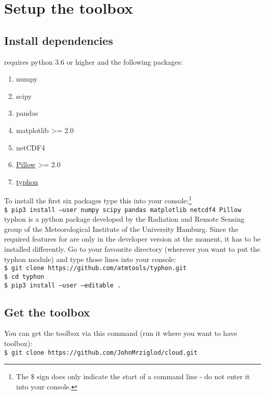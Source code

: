 \documentclass[11pt,a4paper]{article}
\begin{document}
\section{Setup the \cloud toolbox}
\label{sec:setup}
\subsection{Install dependencies}
\cloud requires python 3.6 or higher and the following packages:
\begin{enumerate}
	\item numpy
	\item scipy
	\item pandas
	\item matplotlib \textgreater= 2.0
	\item netCDF4
	\item \href{http://pillow.readthedocs.io/en/4.3.x/}{Pillow} \textgreater= 2.0
	\item\href{https://github.com/atmtools/typhon}{typhon}
\end{enumerate}

To install the first six packages type this into your console:\footnote{The \$ sign does only indicate the start of a command line - do not enter it into your console.}\\
\texttt{\$ pip3 install --user numpy scipy pandas matplotlib netcdf4 Pillow}\\

typhon is a python package developed by the Radiation and Remote Sensing group of the Meteorological Institute of the University Hamburg. Since the required features for \cloud are only in the developer version at the moment, it has to be installed differently. Go to your favourite directory (wherever you want to put the typhon module) and type those lines into your console:\\
\texttt{\$ git clone https://github.com/atmtools/typhon.git}\\
\texttt{\$ cd typhon}\\
\texttt{\$ pip3 install --user --editable .}\\

\subsection{Get the \cloud toolbox}
You can get the \cloud toolbox via this command (run it where you want to have \cloud toolbox):\\
\texttt{\$ git clone https://github.com/JohnMrziglod/cloud.git}\\
\end{document}
